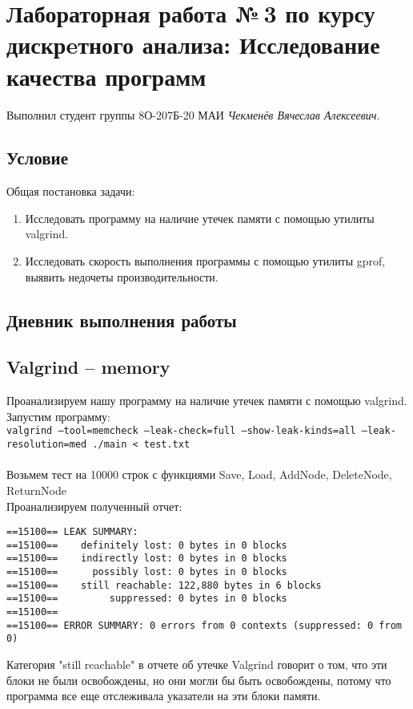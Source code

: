 \documentclass[12pt]{article}
\begin{document}
\section*{Лабораторная работа №\,3 по курсу дискрeтного анализа: Исследование качества программ}

Выполнил студент группы 8О-207Б-20 МАИ \textit{Чекменёв Вячеслав Алексеевич}.

\subsection*{Условие}

Общая постановка задачи:
\begin{enumerate}
\item Исследовать программу на наличие утечек памяти с помощью утилиты valgrind.

\item Исследовать скорость выполнения программы с помощью утилиты gprof, выявить недочеты производительности.

\end{enumerate}

\subsection*{Дневник выполнения работы}

\subsection{Valgrind -- memory}
Проанализируем нашу программу на наличие утечек памяти с помощью valgrind. \\
Запустим программу: \\
\texttt{valgrind --tool=memcheck --leak-check=full --show-leak-kinds=all 
--leak-resolution=med ./main < test.txt} \\\\
Возьмем тест на 10000 строк с функциями Save, Load, AddNode, DeleteNode, ReturnNode\\
Проанализируем полученный отчет: \\
\begin{lstlisting}
==15100== LEAK SUMMARY:
==15100==    definitely lost: 0 bytes in 0 blocks
==15100==    indirectly lost: 0 bytes in 0 blocks
==15100==      possibly lost: 0 bytes in 0 blocks
==15100==    still reachable: 122,880 bytes in 6 blocks
==15100==         suppressed: 0 bytes in 0 blocks
==15100== 
==15100== ERROR SUMMARY: 0 errors from 0 contexts (suppressed: 0 from 0)
\end{lstlisting}
Категория "still reachable" в отчете об утечке Valgrind говорит о том, что эти блоки не были освобождены, но они могли бы быть освобождены, потому что программа все еще отслеживала указатели на эти блоки памяти.\\
\end{document}
